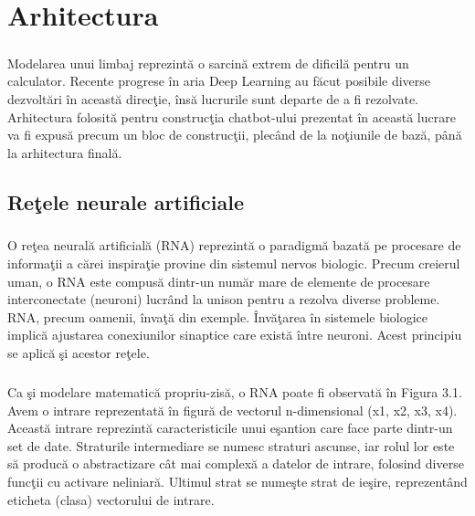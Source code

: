 \chapter{Arhitectura}

\paragraph{}
Modelarea unui limbaj reprezint\u a o sarcin\u a extrem de dificil\u a pentru un calculator. Recente progrese \^ in aria Deep Learning au f\u acut posibile diverse dezvolt\u ari \^ in aceast\u a direc\c tie, \^ ins\u a lucrurile sunt departe de a fi rezolvate. Arhitectura folosit\u a pentru construc\c tia chatbot-ului prezentat \^ in aceast\u a lucrare va fi expus\u a precum un bloc de construc\c tii, plec\^ and de la no\c tiunile de baz\u a, p\^ an\u a la arhitectura final\u a.

\section{Re\c tele neurale artificiale}

\paragraph{}
O re\c tea neural\u a artificial\u a (RNA) reprezint\u a o paradigm\u a bazat\u a pe procesare de informa\c tii a c\u arei inspira\c tie provine din sistemul nervos biologic. Precum creierul uman, o RNA este compus\u a dintr-un num\u ar mare de elemente de procesare interconectate (neuroni) lucr\^ and la unison pentru a rezolva diverse probleme. RNA, precum oamenii, \^ inva\c t\u a din exemple. \^ Inv\u a\c tarea \^ in sistemele biologice implic\u a ajustarea conexiunilor sinaptice care exist\u a \^ intre neuroni. Acest principiu se aplic\u a \c si acestor re\c tele.

\paragraph{}
Ca \c si modelare matematic\u a propriu-zis\u a, o RNA poate fi observat\u a \^ in Figura 3.1. Avem o intrare reprezentat\u a \^ in figur\u a de vectorul n-dimensional (x1, x2, x3, x4). Aceast\u a intrare reprezint\u a caracteristicile unui e\c santion care face parte dintr-un set de date. Straturile intermediare se numesc straturi ascunse, iar rolul lor este s\u a produc\u a o abstractizare c\^ at mai complex\u a a datelor de intrare, folosind diverse func\c tii cu activare neliniar\u a. Ultimul strat se nume\c ste strat de ie\c sire, reprezent\^ and eticheta (clasa) vectorului de intrare.

